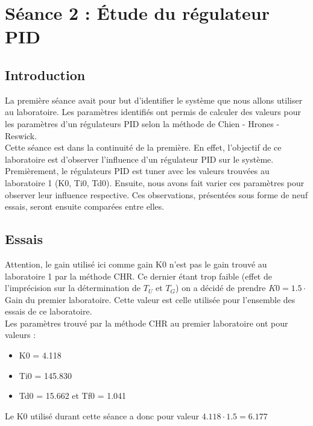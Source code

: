 \section{Séance 2 : \'Etude du régulateur PID}
\subsection{Introduction}
La première séance avait pour but d'identifier le système que nous allons utiliser au laboratoire. Les paramètres identifiés ont permis de calculer des valeurs pour les paramètres d'un régulateurs PID selon la méthode de Chien - Hrones - Reswick. \\

Cette séance est dans la continuité de la première. En effet, l'objectif de ce laboratoire est d'observer l'influence d'un régulateur PID sur le système. Premièrement, le régulateurs PID est tuner avec les valeurs trouvées au laboratoire 1 (K0, Ti0, Td0). Ensuite, nous avons fait varier ces paramètres pour observer leur influence respective. Ces observations, présentées sous forme de neuf essais, seront ensuite comparées entre elles. 

\subsection{Essais}
Attention, le gain utilisé ici comme gain K0 n'est pas le gain trouvé au laboratoire 1 par la méthode CHR. Ce dernier étant trop faible (effet de l'imprécision sur la détermination de $T_{U}$ et $T_{G}$) on a décidé de prendre $K0 = 1.5 \cdot$ Gain du premier laboratoire. Cette valeur est celle utilisée pour l'ensemble des essais de ce laboratoire.\\

Les paramètres trouvé par la méthode CHR au premier laboratoire ont pour valeurs : 
\begin{itemize}
\item K0  = 4.118
\item Ti0 = 145.830
\item Td0 = 15.662 et Tf0 = 1.041
\end{itemize}

Le K0 utilisé durant cette séance a donc pour valeur $4.118 \cdot 1.5 = 6.177$

